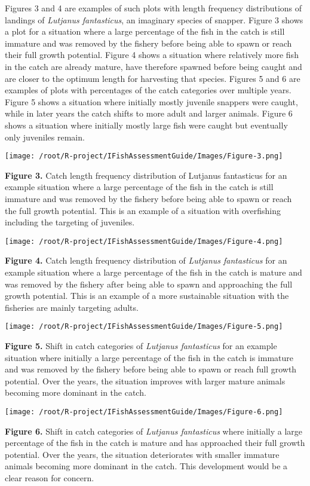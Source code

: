 Figures 3 and 4 are examples of such plots with length frequency distributions of landings of \textit{Lutjanus fantasticus}, an imaginary species of snapper. Figure 3 shows a plot for a situation where a large percentage of the fish in the catch is still immature and was removed by the fishery before being able to spawn or reach their full growth potential. Figure 4 shows a situation where relatively more fish in the catch are already mature, have therefore spawned before being caught and are closer to the optimum length for harvesting that species. Figures 5 and 6 are examples of plots with percentages of the catch categories over multiple years. Figure 5 shows a situation where initially mostly juvenile snappers were caught, while in later years the catch shifts to more adult and larger animals. Figure 6 shows a situation where initially mostly large fish were caught but eventually only juveniles remain.

\begin{center}
\texttt{[image: /root/R-project/IFishAssessmentGuide/Images/Figure-3.png]}
\end{center}
\textbf{Figure 3.} Catch length frequency distribution of Lutjanus fantasticus for an example situation where a large percentage of the fish in the catch is still immature and was removed by the fishery before being able to spawn or reach the full growth potential. This is an example of a situation with overfishing including the targeting of juveniles.

\begin{center}
\texttt{[image: /root/R-project/IFishAssessmentGuide/Images/Figure-4.png]}
\end{center}
\textbf{Figure 4.} Catch length frequency distribution of \textit{Lutjanus fantasticus} for an example situation where a large percentage of the fish in the catch is mature and was removed by the fishery after being able to spawn and approaching the full growth potential. This is an example of a more sustainable situation with the fisheries are mainly targeting adults.

\begin{center}
\texttt{[image: /root/R-project/IFishAssessmentGuide/Images/Figure-5.png]}
\end{center}
\textbf{Figure 5.} Shift in catch categories of \textit{Lutjanus fantasticus} for an example situation where initially a large percentage of the fish in the catch is immature and was removed by the fishery before being able to spawn or reach full growth potential. Over the years, the situation improves with larger mature animals becoming more dominant in the catch.

\begin{center}
\texttt{[image: /root/R-project/IFishAssessmentGuide/Images/Figure-6.png]}
\end{center}
\textbf{Figure 6.} Shift in catch categories of \textit{Lutjanus fantasticus} where initially a large percentage of the fish in the catch is mature and has approached their full growth potential. Over the years, the situation deteriorates with smaller immature animals becoming more dominant in the catch. This development would be a clear reason for concern.
